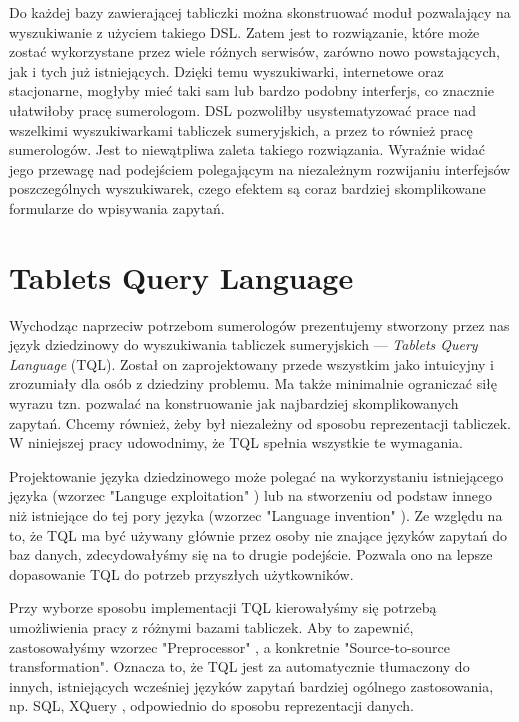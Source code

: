 Do każdej bazy zawierającej tabliczki można skonstruować moduł pozwalający na wyszukiwanie z użyciem takiego DSL.
Zatem jest to rozwiązanie, które może zostać wykorzystane przez wiele różnych serwisów, zarówno nowo powstających, jak i tych już 
istniejących. Dzięki temu wyszukiwarki, internetowe oraz stacjonarne, mogłyby mieć taki sam lub bardzo podobny interferjs, co znacznie 
ułatwiłoby pracę sumerologom. DSL pozwoliłby usystematyzować prace nad wszelkimi wyszukiwarkami tabliczek sumeryjskich, a przez to również 
pracę sumerologów. Jest to niewątpliwa zaleta takiego rozwiązania. Wyraźnie widać jego przewagę nad podejściem polegającym na niezależnym 
rozwijaniu interfejsów poszczególnych wyszukiwarek, czego efektem są coraz bardziej skomplikowane formularze do wpisywania zapytań.


\section*{Tablets Query Language}

Wychodząc naprzeciw potrzebom sumerologów prezentujemy stworzony przez nas język dziedzinowy do wyszukiwania tabliczek sumeryjskich --- 
\textit{Tablets Query Language} (TQL). Został on zaprojektowany przede wszystkim jako intuicyjny i zrozumiały dla osób z dziedziny problemu.
 Ma także minimalnie ograniczać siłę wyrazu tzn. pozwalać na konstruowanie jak najbardziej skomplikowanych zapytań. Chcemy również, żeby 
był niezależny od sposobu reprezentacji tabliczek. W niniejszej pracy udowodnimy, że TQL spełnia wszystkie te wymagania. 


Projektowanie języka dziedzinowego może polegać na wykorzystaniu istniejącego języka (wzorzec "Languge exploitation" \cite{mernik}) 
lub na stworzeniu od podstaw innego niż istniejące do tej pory języka (wzorzec "Language invention" \cite{mernik}).
Ze względu na to, że TQL ma być używany głównie przez osoby nie znające języków zapytań do baz danych,
zdecydowałyśmy się na to drugie podejście. Pozwala ono na lepsze dopasowanie TQL do potrzeb przyszłych
użytkowników.


Przy wyborze sposobu implementacji TQL kierowałyśmy się potrzebą umożliwienia pracy z różnymi bazami tabliczek.
Aby to zapewnić, zastosowałyśmy wzorzec "Preprocessor" \cite{mernik}, a konkretnie
"Source-to-source transformation". Oznacza to, że TQL jest za automatycznie tłumaczony do innych,
istniejących wcześniej języków zapytań bardziej ogólnego zastosowania, np. SQL, XQuery \cite{xquery},
odpowiednio do sposobu reprezentacji danych.


